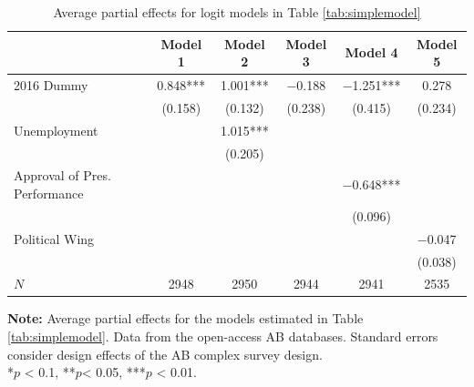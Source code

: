 \documentclass[12pt,a4]{article}\usepackage[]{graphicx}\usepackage[]{xcolor}
\begin{document}
\begin{table}[htbp]
\caption{Average partial effects for logit models in Table \ref{tab:simplemodel}}
\label{tab:apesimp}

\begin{tabular}[t]{lccccc}
\toprule
  & Model 1 & Model 2 & Model 3 & Model 4 & Model 5\\
\midrule
2016 Dummy & \num{0.848}*** & \num{1.001}*** & \num{-0.188} & \num{-1.251}*** & \num{0.278}\\
 & (\num{0.158}) & (\num{0.132}) & (\num{0.238}) & (\num{0.415}) & (\num{0.234})\\
Unemployment &  & \num{1.015}*** &  &  & \\
 &  & (\num{0.205}) &  &  & \\
Approval of Pres. Performance &  &  &  & \num{-0.648}*** & \\
 &  &  &  & (\num{0.096}) & \\
Political Wing &  &  &  &  & \num{-0.047}\\
 &  &  &  &  & (\num{0.038})\\
\midrule
$N$ & \num{2948} & \num{2950} & \num{2944} & \num{2941} & \num{2535}\\
\bottomrule
\end{tabular}


\vspace{0.25cm}
\textbf{Note:} Average partial effects for the models estimated in Table \ref{tab:simplemodel}. Data from the open-access AB databases. Standard errors consider design effects of the AB complex survey design.\\
*$p$ < 0.1, **$p$< 0.05, ***$p$ < 0.01.
\end{table}





\end{document}
